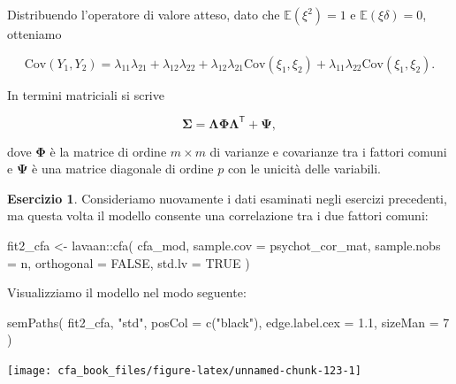 \documentclass[
  11pt,
]{krantz}
\makeatletter
\newenvironment{Shaded}{\begin{snugshade}}{\end{snugshade}}
\newcommand{\AttributeTok}[1]{\textcolor[rgb]{0.61,0.61,0.61}{#1}}
\newcommand{\ConstantTok}[1]{\textcolor[rgb]{0,0,0}{#1}}
\newcommand{\DecValTok}[1]{\textcolor[rgb]{0.06,0.06,0.06}{#1}}
\newcommand{\FloatTok}[1]{\textcolor[rgb]{0.06,0.06,0.06}{#1}}
\newcommand{\FunctionTok}[1]{\textcolor[rgb]{0,0,0}{#1}}
\newcommand{\NormalTok}[1]{#1}
\newcommand{\OtherTok}[1]{\textcolor[rgb]{0.37,0.37,0.37}{#1}}
\newcommand{\SpecialCharTok}[1]{\textcolor[rgb]{0,0,0}{#1}}
\newcommand{\StringTok}[1]{\textcolor[rgb]{0.5,0.5,0.5}{#1}}
\newenvironment{kframe}{%
\medskip{}
\setlength{\fboxsep}{.8em}
 \def\at@end@of@kframe{}%
 \ifinner\ifhmode%
  \def\at@end@of@kframe{\end{minipage}}%
  \begin{minipage}{\columnwidth}%
 \fi\fi%
 \def\FrameCommand##1{\hskip\@totalleftmargin \hskip-\fboxsep
 \colorbox{shadecolor}{##1}\hskip-\fboxsep
     \hskip-\linewidth \hskip-\@totalleftmargin \hskip\columnwidth}%
 \MakeFramed {\advance\hsize-\width
   \@totalleftmargin\z@ \linewidth\hsize
   \@setminipage}}%
 {\par\unskip\endMakeFramed%
 \at@end@of@kframe}
\renewenvironment{Shaded}{\begin{kframe}}{\end{kframe}}
\newcommand{\E}{\mathbb{E}} %
\theoremstyle{definition}
\theoremstyle{definition}
\theoremstyle{definition}
\newtheorem{exercise}{Esercizio}[chapter]
\theoremstyle{definition}
\theoremstyle{remark}
\makeatother
\begin{document}
Distribuendo l'operatore di valore atteso, dato che \(\E(\xi^2)=1\) e \(\E(\xi \delta)=0\), otteniamo

\[
\mbox{Cov}(Y_1, Y_2) = \lambda_{11} \lambda_{21} + \lambda_{12} \lambda_{22} + 
\lambda_{12} \lambda_{21}\mbox{Cov}(\xi_1, \xi_2) +\lambda_{11} \lambda_{22}\mbox{Cov}(\xi_1, \xi_2).
\]

In termini matriciali si scrive

\[
\boldsymbol{\Sigma} =\boldsymbol{\Lambda} \boldsymbol{\Phi} \boldsymbol{\Lambda}^{\mathsf{T}} + \boldsymbol{\Psi}, 
\]

dove \(\boldsymbol{\Phi}\) è la matrice di ordine \(m \times m\) di varianze e covarianze tra i fattori comuni e \(\boldsymbol{\Psi}\) è una matrice diagonale di ordine \(p\) con le unicità delle variabili.

\begin{exercise}

Consideriamo nuovamente i dati esaminati negli esercizi precedenti, ma questa volta il modello consente una correlazione tra i due fattori comuni:

\begin{Shaded}
\begin{Highlighting}[]
\NormalTok{fit2\_cfa }\OtherTok{\textless{}{-}}\NormalTok{ lavaan}\SpecialCharTok{::}\FunctionTok{cfa}\NormalTok{(}
\NormalTok{  cfa\_mod,}
  \AttributeTok{sample.cov =}\NormalTok{ psychot\_cor\_mat,}
  \AttributeTok{sample.nobs =}\NormalTok{ n,}
  \AttributeTok{orthogonal =} \ConstantTok{FALSE}\NormalTok{,}
  \AttributeTok{std.lv =} \ConstantTok{TRUE}
\NormalTok{)}
\end{Highlighting}
\end{Shaded}

Visualizziamo il modello nel modo seguente:

\begin{Shaded}
\begin{Highlighting}[]
\FunctionTok{semPaths}\NormalTok{(}
\NormalTok{  fit2\_cfa,}
  \StringTok{"std"}\NormalTok{,}
  \AttributeTok{posCol =} \FunctionTok{c}\NormalTok{(}\StringTok{"black"}\NormalTok{),}
  \AttributeTok{edge.label.cex =} \FloatTok{1.1}\NormalTok{,}
  \AttributeTok{sizeMan =} \DecValTok{7}
\NormalTok{)}
\end{Highlighting}
\end{Shaded}

\begin{center}\texttt{[image: cfa\_book\_files/figure-latex/unnamed-chunk-123-1]} \end{center}


\end{exercise}
\end{document}
